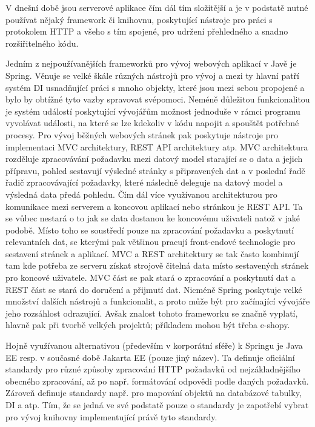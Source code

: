 \begin{itemize}
\begin{itemize}
		V dnešní době jsou serverové aplikace čím dál tím složitější a je v podstatě nutné používat nějaký framework
		či knihovnu, poskytující nástroje pro práci s protokolem \Ac{HTTP} a všeho s tím spojené, pro udržení
		přehledného a snadno rozšiřitelného kódu.

		Jedním z nejpoužívanějších frameworků pro vývoj webových aplikací v Javě je Spring.
		Věnuje se velké škále různých nástrojů pro vývoj a mezi ty hlavní patří systém \noindent\Ac{DI} usnadňující práci s
		mnoho objekty, které jsou mezi sebou propojené a bylo by obtížné tyto vazby spravovat svépomoci.
		Neméně důležitou funkcionalitou je systém událostí poskytující vývojářům možnost jednoduše v rámci programu vyvolávat
		události, na které se lze kdekoliv v kódu napojit a spouštět potřebné procesy. \cite{spring_framework_documentation_core}
		Pro vývoj běžných webových stránek pak poskytuje nástroje pro implementaci \noindent\Ac{MVC}
		architektury, \noindent\Ac{REST} API architektury atp. \cite{spring_framework_documentaiton_web}
		\Ac{MVC} architektura rozděluje zpracovávání požadavku mezi datový model starající se o data a jejich přípravu,
		pohled sestavují výsledné stránky s připravených dat a v poslední řadě řadič zpracovávající požadavky,
		které následně deleguje na datový model a výsledná data předá pohledu. \cite{mvc}
		Čím dál více využívanou architekturou pro komunikace mezi serverem a koncovou aplikací nebo stránkou je \Ac{REST} API.
		Ta se vůbec nestará o to jak se data dostanou ke koncovému uživateli natož v jaké podobě.
		Místo toho se soustředí pouze na zpracování požadavku a poskytnutí relevantních dat, se kterými pak
		většinou pracují front-endové technologie pro sestavení stránek a aplikací. \cite{restfulapi}
		\ac{MVC} a \ac{REST} architektury se tak často kombinují tam kde potřeba ze serveru získat strojově čitelná data
		místo sestavených stránek pro koncové uživatele. \ac{MVC} část se pak stará o zpracování a poskytnutí dat
		a \ac{REST} část se stará do doručení a přijmutí dat.
		Nicméně Spring poskytuje velké množství dalších nástrojů a funkcionalit, a proto může být pro začínající vývojáře
		jeho rozsáhlost odrazující.
		Avšak znalost tohoto frameworku se značně vyplatí, hlavně pak při tvorbě velkých projektů; příkladem mohou být
		třeba e-shopy.

		Hojně využívanou alternativou (především v korporátní sféře) k Springu je Java EE resp. v současné době
		Jakarta EE (pouze jiný název).
		Ta definuje oficiální standardy pro různé způsoby zpracování \Ac{HTTP} požadavků od nejzákladnějšího obecného
		zpracování, až po např. formátování odpovědi podle daných požadavků.
		Zároveň definuje standardy např. pro mapování objektů na databázové tabulky, \Ac{DI} a atp.
		Tím, že se jedná ve své podstatě pouze o standardy je zapotřebí vybrat pro vývoj knihovny implementující právě tyto
		standardy. \cite{jakarta_ee}


\end{itemize}
\end{itemize}
